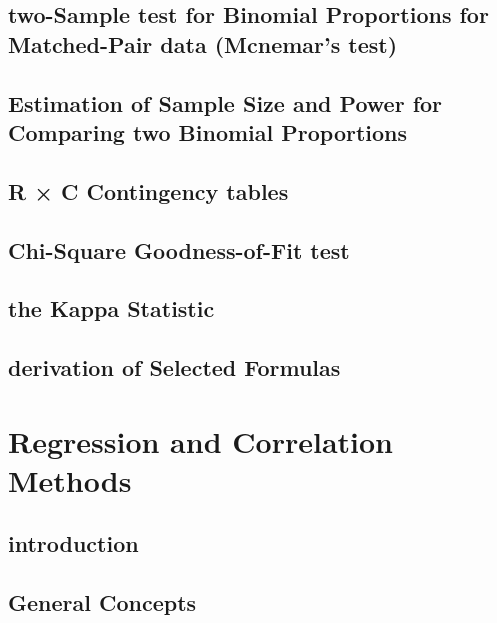 \documentclass[12pt,]{article}
\theoremstyle{definition}
\theoremstyle{definition}
\theoremstyle{definition}
\theoremstyle{remark}
\begin{document}
\subsection{two-Sample test for Binomial Proportions for Matched-Pair
data (Mcnemar's
test)}\label{two-sample-test-for-binomial-proportions-for-matched-pair-data-mcnemars-test}

\subsection{Estimation of Sample Size and Power for Comparing two
Binomial
Proportions}\label{estimation-of-sample-size-and-power-for-comparing-two-binomial-proportions}

\subsection{R × C Contingency tables}\label{r-c-contingency-tables}

\subsection{Chi-Square Goodness-of-Fit
test}\label{chi-square-goodness-of-fit-test}

\subsection{the Kappa Statistic}\label{the-kappa-statistic}

\subsection{derivation of Selected
Formulas}\label{derivation-of-selected-formulas}

\section{Regression and Correlation
Methods}\label{regression-and-correlation-methods}

\subsection{introduction}\label{introduction-8}

\subsection{General Concepts}\label{general-concepts-2}
\end{document}
